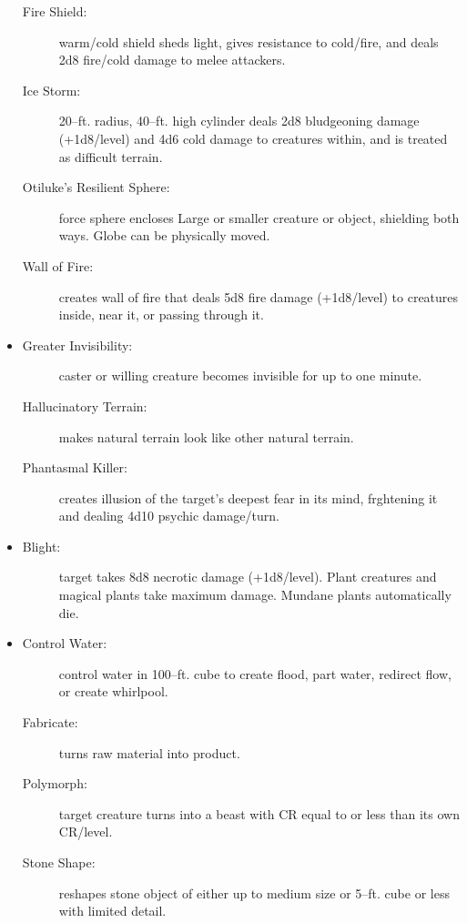 \documentclass[DIV=14, paper=a4, fontsize=12pt, twocolumn, twoside]{scrartcl}
\begin{document}
\begin{itemize}[align=parleft,labelwidth=1cm]
\begin{description}
 \item[Fire Shield:] warm/cold shield sheds light, gives resistance to cold/fire, and deals 2d8 fire/cold damage to melee attackers.
 \item[Ice Storm:] 20–ft. radius, 40–ft. high cylinder deals 2d8 bludgeoning damage (+1d8/level) and 4d6 cold damage to creatures within, and is treated as difficult terrain.
 \item[Otiluke’s Resilient Sphere:] force sphere encloses Large or smaller creature or object, shielding both ways. Globe can be physically moved.
 \item[Wall of Fire:] creates wall of fire that deals 5d8 fire damage (+1d8/level) to creatures inside, near it, or passing through it.
\end{description}
\renewcommand{\labelitemi}{Illus}\item
\begin{description}
 \item[Greater Invisibility:] caster or willing creature becomes invisible for up to one minute.
 \item[Hallucinatory Terrain:] makes natural terrain look like other natural terrain.
 \item[Phantasmal Killer:] creates illusion of the target’s deepest fear in its mind, frghtening it and dealing 4d10 psychic damage/turn.
\end{description}
\renewcommand{\labelitemi}{Necro}\item
\begin{description}
 \item[Blight:] target takes 8d8 necrotic damage (+1d8/level). Plant creatures and magical plants take maximum damage. Mundane plants automatically die.
\end{description}
\renewcommand{\labelitemi}{Trans}\item
\begin{description}
 \item[Control Water:] control water in 100–ft. cube to create flood, part water, redirect flow, or create whirlpool.
 \item[Fabricate:] turns raw material into product.
 \item[Polymorph:] target creature turns into a beast with CR equal to or less than its own CR/level.
 \item[Stone Shape:] reshapes stone object of either up to medium size or 5–ft. cube or less with limited detail.
\end{description}
\end{itemize}
\end{document}
